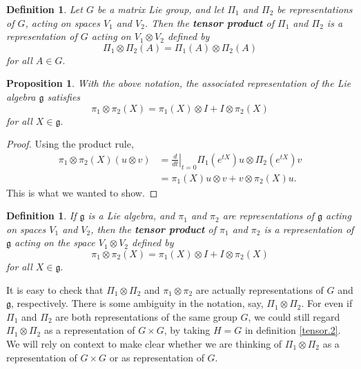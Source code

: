 \documentclass{amsbook}
\let \frak = \mathfrak
\theoremstyle{plain}
\newtheorem{definition}[theorem]{Definition}
\newtheorem{proposition}[theorem]{Proposition}
\numberwithin{equation}{chapter}
\numberwithin{theorem}{chapter}
\begin{document}
\begin{definition}
Let $G$ be a matrix Lie group, and let $\Pi_{1}$ and $\Pi_{2}$ be
representations of $G$, acting on spaces $V_{1}$ and $V_{2}$. Then the
\textbf{tensor product} of $\Pi_{1}$ and $\Pi_{2}$ is a representation of $G$
acting on $V_{1}\otimes V_{2}$ defined by
\[
\Pi_{1}\otimes\Pi_{2}(A)=\Pi_{1}(A)\otimes\Pi_{2}(A)
\]
for all $A\in G.$
\end{definition}

\begin{proposition}
With the above notation, the associated representation of the Lie algebra
$\frak{g}$ satisfies
\[
\pi_{1}\otimes\pi_{2}(X)=\pi_{1}(X)\otimes I+I\otimes\pi_{2}(X)
\]
for all $X\in\frak{g}.$
\end{proposition}

\begin{proof}
Using the product rule,
\begin{align*}
\pi_{1}\otimes\pi_{2}(X)\left(  u\otimes v\right)    & =\left.  \frac{d}%
{dt}\right|  _{t=0}\Pi_{1}\left(  e^{tX}\right)  u\otimes\Pi_{2}\left(
e^{tX}\right)  v\\
& =\pi_{1}\left(  X\right)  u\otimes v+v\otimes\pi_{2}\left(  X\right)
u\text{.}%
\end{align*}
This is what we wanted to show.
\end{proof}

\begin{definition}
\label{algebra.tensor}If $\frak{g}$ is a Lie algebra, and $\pi_{1}$ and
$\pi_{2}$ are representations of $\frak{g}$ acting on spaces $V_{1}$ and
$V_{2}$, then the \textbf{tensor product} of $\pi_{1}$ and $\pi_{2}$ is a
representation of $\frak{g}$ acting on the space $V_{1}\otimes V_{2}$ defined
by
\[
\pi_{1}\otimes\pi_{2}(X)=\pi_{1}(X)\otimes I+I\otimes\pi_{2}(X)
\]
for all $X\in\frak{g}.$
\end{definition}

It is easy to check that $\Pi_{1}\otimes\Pi_{2}$ and $\pi_{1}\otimes\pi_{2}$
are actually representations of $G$ and $\frak{g}$, respectively. There is
some ambiguity in the notation, say, $\Pi_{1}\otimes\Pi_{2}$. For even if
$\Pi_{1}$ and $\Pi_{2}$ are both representations of the same group $G$, we
could still regard $\Pi_{1}\otimes\Pi_{2}$ as a representation of $G\times G$,
by taking $H=G$ in definition \ref{tensor.2}. We will rely on context to make
clear whether we are thinking of $\Pi_{1}\otimes\Pi_{2}$ as a representation
of $G\times G$ or as representation of $G$.
\end{document}
